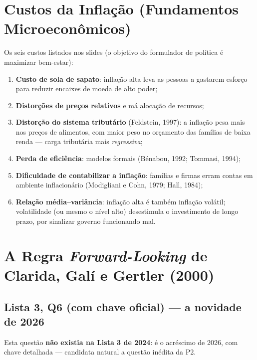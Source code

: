 \documentclass[12pt, a4paper]{article}
\begin{document}
\section{Custos da Inflação (Fundamentos Microeconômicos)}

Os seis custos listados nos slides (o objetivo do formulador de política é
maximizar bem-estar):
\begin{enumerate}[leftmargin=1.6em, itemsep=0.15em]
\item \textbf{Custo de sola de sapato}: inflação alta leva as pessoas a
gastarem esforço para reduzir encaixes de moeda de alto poder;
\item \textbf{Distorções de preços relativos} e má alocação de recursos;
\item \textbf{Distorção do sistema tributário} (Feldstein, 1997): a inflação
pesa mais nos preços de alimentos, com maior peso no orçamento das famílias de
baixa renda --- carga tributária mais \emph{regressiva};
\item \textbf{Perda de eficiência}: modelos formais (Bénabou, 1992; Tommasi,
1994);
\item \textbf{Dificuldade de contabilizar a inflação}: famílias e firmas erram
contas em ambiente inflacionário (Modigliani e Cohn, 1979; Hall, 1984);
\item \textbf{Relação média--variância}: inflação alta é também inflação
volátil; volatilidade (ou mesmo o nível alto) desestimula o investimento de
longo prazo, por sinalizar governo funcionando mal.
\end{enumerate}

\section{A Regra \emph{Forward-Looking} de Clarida, Galí e Gertler (2000)}

\subsection{Lista 3, Q6 (com chave oficial) --- a novidade de 2026}

Esta questão \textbf{não existia na Lista 3 de 2024}: é o acréscimo de 2026,
com chave detalhada --- candidata natural a questão inédita da P2.
\end{document}
